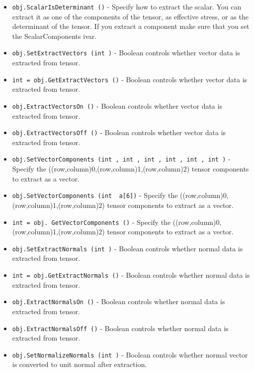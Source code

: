 \begin{itemize}
\item  \verb|obj.ScalarIsDeterminant ()| -  Specify how to extract the scalar. You can extract it as one of
 the components of the tensor, as effective stress, or as the
 determinant of the tensor. If you extract a component make sure
 that you set the ScalarComponents ivar.

\item  \verb|obj.SetExtractVectors (int )| -  Boolean controls whether vector data is extracted from tensor.

\item  \verb|int = obj.GetExtractVectors ()| -  Boolean controls whether vector data is extracted from tensor.

\item  \verb|obj.ExtractVectorsOn ()| -  Boolean controls whether vector data is extracted from tensor.

\item  \verb|obj.ExtractVectorsOff ()| -  Boolean controls whether vector data is extracted from tensor.

\item  \verb|obj.SetVectorComponents (int , int , int , int , int , int )| -  Specify the ((row,column)0,(row,column)1,(row,column)2) tensor
 components to extract as a vector.

\item  \verb|obj.SetVectorComponents (int  a[6])| -  Specify the ((row,column)0,(row,column)1,(row,column)2) tensor
 components to extract as a vector.

\item  \verb|int = obj. GetVectorComponents ()| -  Specify the ((row,column)0,(row,column)1,(row,column)2) tensor
 components to extract as a vector.

\item  \verb|obj.SetExtractNormals (int )| -  Boolean controls whether normal data is extracted from tensor.

\item  \verb|int = obj.GetExtractNormals ()| -  Boolean controls whether normal data is extracted from tensor.

\item  \verb|obj.ExtractNormalsOn ()| -  Boolean controls whether normal data is extracted from tensor.

\item  \verb|obj.ExtractNormalsOff ()| -  Boolean controls whether normal data is extracted from tensor.

\item  \verb|obj.SetNormalizeNormals (int )| -  Boolean controls whether normal vector is converted to unit normal
 after extraction.


\end{itemize}
